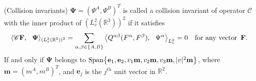 \documentclass[reqno]{amsart}
\numberwithin{equation}{section}
\numberwithin{equation}{section}
\begin{document}
 \noindent (Collision invariants)  $\mathbf{\Psi}=(\Psi^{A},\Psi^{B})^{T}$ is called a collision invariant of operator $\mathscr{C}$ with the inner product of $(L^2_v(\mathbb{R}^3))^2$ if it satisfies
	\begin{equation}\label{Collision invariants}
		\langle\mathscr{C}\mathbf{F}, ~~\mathbf{\Psi} \rangle_{(L_v^2(\mathbb{R}^3))^2} =\sum_{\alpha,\beta\in \{A,B\}}\left\langle Q^{\alpha  \beta}(F^{\alpha},F^{\beta}) , ~~\Psi^{\alpha} \right\rangle_{L_v^2}
		=0\quad {\rm for ~any ~vector}\,~ \mathbf{F}.
	\end{equation}
	If and only if $\mathbf{\Psi}$ belongs to ${\rm Span} \big\{\mathbf{e}_1, \mathbf{e}_2, v_1 \mathbf{m}, v_2 \mathbf{m}, v_3 \mathbf{m}, |v|^2 \mathbf{m}\big\} $, where  $\mathbf{m} = (m^A,m^B )^T$, and $ \mathbf{e}_j$ is the $j^{th}$ unit vector in $\mathbb{R}^2$.
	
\end{document}
